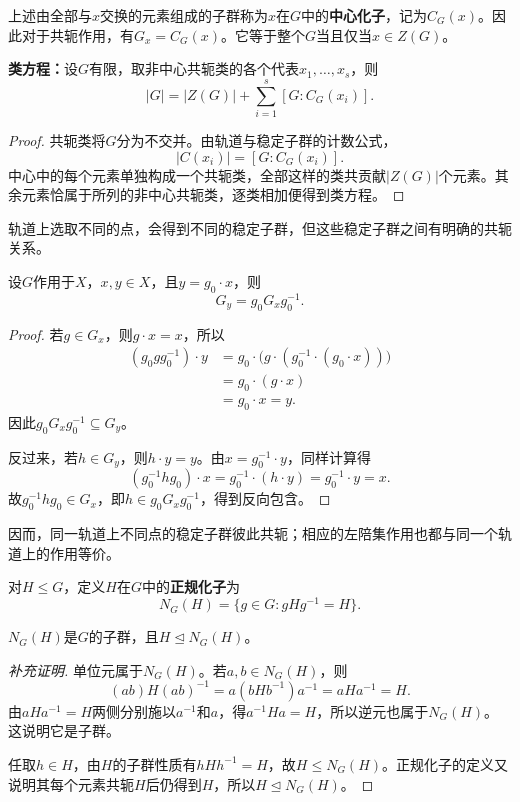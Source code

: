 \begin{definition}
上述由全部与$x$交换的元素组成的子群称为$x$在$G$中的\textbf{中心化子}，记为$C_G(x)$。因此对于共轭作用，有$G_x=C_G(x)$。它等于整个$G$当且仅当$x\in Z(G)$。
\end{definition}

\begin{theorem}\label{p2:class-equation}
\textbf{类方程：}设$G$有限，取非中心共轭类的各个代表$x_1,\ldots,x_s$，则
\[
|G|=|Z(G)|+\sum_{i=1}^s[G:C_G(x_i)].
\]
\end{theorem}
\begin{proof}
共轭类将$G$分为不交并。由轨道与稳定子群的计数公式，
\[
|C(x_i)|=[G:C_G(x_i)].
\]
中心中的每个元素单独构成一个共轭类，全部这样的类共贡献$|Z(G)|$个元素。其余元素恰属于所列的非中心共轭类，逐类相加便得到类方程。
\end{proof}

轨道上选取不同的点，会得到不同的稳定子群，但这些稳定子群之间有明确的共轭关系。

\begin{theorem}
设$G$作用于$X$，$x,y\in X$，且$y=g_0\cdot x$，则
\[
G_y=g_0G_xg_0^{-1}.
\]
\end{theorem}
\begin{proof}
若$g\in G_x$，则$g\cdot x=x$，所以
\begin{align*}
(g_0gg_0^{-1})\cdot y
&=g_0\cdot\bigl(g\cdot(g_0^{-1}\cdot(g_0\cdot x))\bigr)\\
&=g_0\cdot(g\cdot x)\\
&=g_0\cdot x=y.
\end{align*}
因此$g_0G_xg_0^{-1}\subseteq G_y$。

反过来，若$h\in G_y$，则$h\cdot y=y$。由$x=g_0^{-1}\cdot y$，同样计算得
\[
(g_0^{-1}hg_0)\cdot x
=g_0^{-1}\cdot(h\cdot y)=g_0^{-1}\cdot y=x.
\]
故$g_0^{-1}hg_0\in G_x$，即$h\in g_0G_xg_0^{-1}$，得到反向包含。
\end{proof}

因而，同一轨道上不同点的稳定子群彼此共轭；相应的左陪集作用也都与同一个轨道上的作用等价。

\begin{definition}
对$H\leq G$，定义$H$在$G$中的\textbf{正规化子}为
\[
N_G(H)=\{g\in G:gHg^{-1}=H\}.
\]
\end{definition}
\begin{proposition}
$N_G(H)$是$G$的子群，且$H\trianglelefteq N_G(H)$。
\end{proposition}
\begin{proof}[补充证明]
单位元属于$N_G(H)$。若$a,b\in N_G(H)$，则
\[
(ab)H(ab)^{-1}=a(bHb^{-1})a^{-1}=aHa^{-1}=H.
\]
由$aHa^{-1}=H$两侧分别施以$a^{-1}$和$a$，得$a^{-1}Ha=H$，所以逆元也属于$N_G(H)$。这说明它是子群。

任取$h\in H$，由$H$的子群性质有$hHh^{-1}=H$，故$H\leq N_G(H)$。正规化子的定义又说明其每个元素共轭$H$后仍得到$H$，所以$H\trianglelefteq N_G(H)$。
\end{proof}

